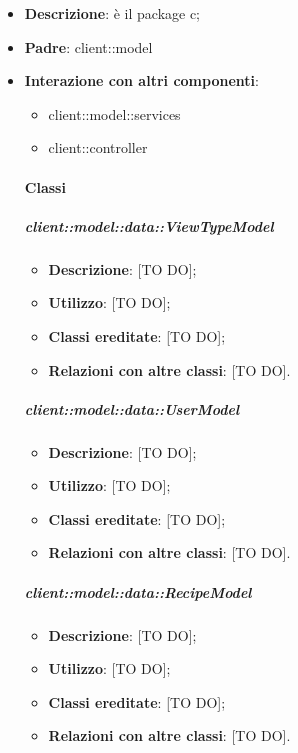 \begin{itemize}
	\item \textbf{Descrizione}: è il package c;
	\item \textbf{Padre}: client::model
	\item \textbf{Interazione con altri componenti}:
		\begin{itemize}
			\item client::model::services
			\item client::controller
		\end{itemize}

	\paragraph{Classi} %

		\subparagraph{client::model::data::ViewTypeModel} %
		\label{subp:client_model_data_viewtypemodel}
			\begin{itemize}
				\item \textbf{Descrizione}: [TO DO];
				\item \textbf{Utilizzo}: [TO DO];
				\item \textbf{Classi ereditate}: [TO DO];
				\item \textbf{Relazioni con altre classi}: [TO DO].
			\end{itemize}


		\subparagraph{client::model::data::UserModel} %
		\label{subp:client_model_data_user}
			\begin{itemize}
				\item \textbf{Descrizione}: [TO DO];
				\item \textbf{Utilizzo}: [TO DO];
				\item \textbf{Classi ereditate}: [TO DO];
				\item \textbf{Relazioni con altre classi}: [TO DO].
			\end{itemize}

		\subparagraph{client::model::data::RecipeModel} %
		\label{subp:client_model_data_recipe}
			\begin{itemize}
				\item \textbf{Descrizione}: [TO DO];
				\item \textbf{Utilizzo}: [TO DO];
				\item \textbf{Classi ereditate}: [TO DO];
				\item \textbf{Relazioni con altre classi}: [TO DO].
			\end{itemize}


\end{itemize}
